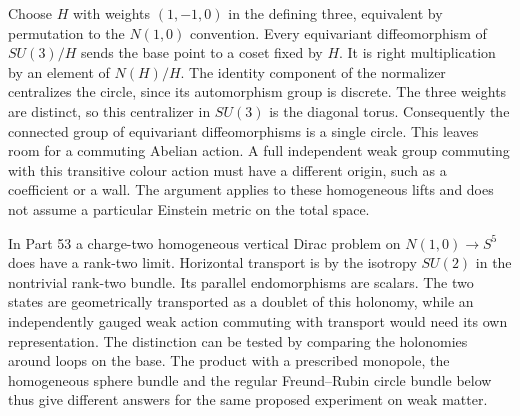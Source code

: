 \documentclass[aps,prd,reprint,onecolumn,nofootinbib,amsmath,amssymb]{revtex4-2}
\begin{document}
Choose $H$ with weights $(1,-1,0)$ in the defining three, equivalent by permutation to the $N(1,0)$ convention. Every equivariant diffeomorphism of $SU(3)/H$ sends the base point to a coset fixed by $H$. It is right multiplication by an element of $N(H)/H$. The identity component of the normalizer centralizes the circle, since its automorphism group is discrete. The three weights are distinct, so this centralizer in $SU(3)$ is the diagonal torus. Consequently the connected group of equivariant diffeomorphisms is a single circle. This leaves room for a commuting Abelian action. A full independent weak group commuting with this transitive colour action must have a different origin, such as a coefficient or a wall. The argument applies to these homogeneous lifts and does not assume a particular Einstein metric on the total space.

In Part 53 a charge-two homogeneous vertical Dirac problem on $N(1,0)\to S^5$ does have a rank-two limit. Horizontal transport is by the isotropy $SU(2)$ in the nontrivial rank-two bundle. Its parallel endomorphisms are scalars. The two states are geometrically transported as a doublet of this holonomy, while an independently gauged weak action commuting with transport would need its own representation. The distinction can be tested by comparing the holonomies around loops on the base. The product with a prescribed monopole, the homogeneous sphere bundle and the regular Freund--Rubin circle bundle below thus give different answers for the same proposed experiment on weak matter.
\end{document}
